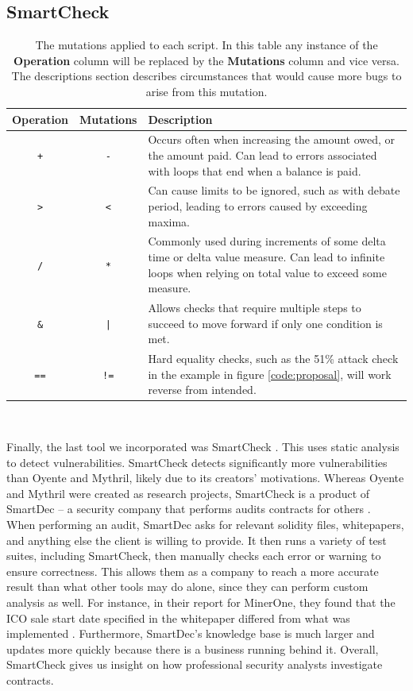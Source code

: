 \subsection*{SmartCheck}
\begin{table}[ht!]
\centering
\begin{tabular}{|ccp{4.5in}|}
\hline
\textbf{Operation} & \textbf{Mutations} & \textbf{Description} \\
\hline
\texttt{+}  &   \texttt{-}   &   Occurs often when increasing the amount owed, or the amount paid. Can lead to errors associated with loops that end when a balance is paid. \\
\texttt{>}  &   \texttt{<}   &   Can cause limits to be ignored, such as with debate period, leading to errors caused by exceeding maxima.  \\
\texttt{/}  &   \texttt{*}   &   Commonly used during increments of some delta time or delta value measure. Can lead to infinite loops when relying on total value to exceed some measure. \\
\texttt{\&}  &   \texttt{|}   &  Allows checks that require multiple steps to succeed to move forward if only one condition is met. \\
\texttt{==}  &   \texttt{!=}   &   Hard equality checks, such as the 51\% attack check in the example in figure \ref{code:proposal}, will work reverse from intended.\\
\hline
\end{tabular}\\
\label{Mutations}
\caption{ The mutations applied to each script. In this table any instance of the \textbf{Operation} column will be replaced by the \textbf{Mutations} column and vice versa. The descriptions section describes circumstances that would cause more bugs to arise from this mutation. }
\end{table} 
Finally, the last tool we incorporated was SmartCheck \cite{smartcheck}. This uses static analysis to detect vulnerabilities. SmartCheck detects significantly more vulnerabilities than Oyente and Mythril, likely due to its creators' motivations. Whereas Oyente and Mythril were created as research projects, SmartCheck is a product of SmartDec -- a security company that performs audits contracts for others \cite{smartdec}. \\

When performing an audit, SmartDec asks for relevant solidity files, whitepapers, and anything else the client is willing to provide. It then runs a variety of test suites, including SmartCheck, then manually checks each error or warning to ensure correctness. This allows them as a company to reach a more accurate result than what other tools may do alone, since they can perform custom analysis as well. For instance, in their report for MinerOne, they found that the ICO sale start date specified in the whitepaper differed from what was implemented \cite{minerone}. Furthermore, SmartDec's knowledge base is much larger and updates more quickly because there is a business running behind it. Overall, SmartCheck gives us insight on how professional security analysts investigate contracts. 

